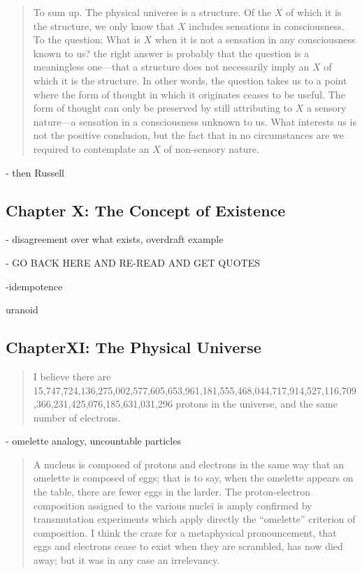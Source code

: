 \begin{quote}
    To sum up.  The physical universe is a structure.  Of the $X$ of which it is the structure, we only know that $X$ includes sensations in consciousness.  To the question: What is $X$ when it is not a sensation in any consciousness known to us? the right answer is probably that the question is a meaningless one---that a structure does not necessarily imply an $X$ of which it is the structure.  In other words, the question takes us to a point where the form of thought in which it originates ceases to be useful.  The form of thought can only be preserved by still attributing to $X$ a sensory nature---a sensation in a consciousness unknown to us.  What interests us is not the positive conslusion, but the fact that in no circumstances are we required to contemplate an $X$ of non-sensory nature.  \citep[p. 150-151]{Eddington1939}
\end{quote}

- then Russell


\subsection{Chapter X: The Concept of Existence}

- disagreement over what exists, overdraft example

- GO BACK HERE AND RE-READ AND GET QUOTES

-idempotence

uranoid

\subsection{ChapterXI: The Physical Universe}

\begin{quote}
    I believe there are 15,747,724,136,275,002,577,605,653,961,181,555,468,044,717,914,527,116,709,366,231,425,076,185,631,031,296 protons in the universe, and the same number of electrons.  \citep[p. 170]{Eddington1939}
\end{quote}


- omelette analogy, uncountable particles

\begin{quote}
    A nucleus is composed of protons and electrons in the same way that an omelette is composed of eggs; that is to say, when the omelette appears on the table, there are fewer eggs in the larder.  The proton-electron composition assigned to the various nuclei is amply confirmed by transmutation experiments which apply directly the ``omelette'' criterion of composition.  I think the craze for a metaphysical pronouncement, that eggs and electrons cease to exist when they are scrambled, has now died away; but it was in any case an irrelevancy.  \citep[p. 170-171]{Eddington1939}
\end{quote}

